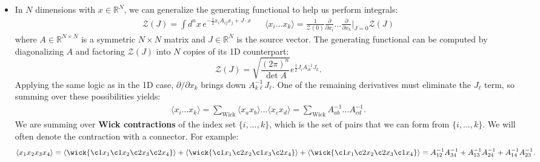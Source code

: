 \documentclass[12pt, oneside]{article}   	%
\theoremstyle{definition}
\begin{document}
\begin{itemize}
	\item In $N$ dimensions with $x\in\mathbb R^N$, we can generalize the generating functional to help us perform 
	integrals:
	\begin{align}
		\mathcal Z(J) = \int d^n x\, e^{-\frac{1}{2} x_i A_{ij} x_j + J\cdot x} && \langle x_i ... x_k\rangle = 
		\frac{1}{\mathcal Z(0)} \frac{\partial}{\partial x_i} ... \frac{\partial}{\partial x_k}\bigg|_{J = 0} \mathcal Z(J)
	\end{align}
	where $A\in\mathbb R^{N\times N}$ is a symmetric $N\times N$ matrix and $J\in\mathbb R^N$ is the source vector. 
	The generating functional can be computed by diagonalizing $A$ and factoring $\mathcal Z(J)$ into $N$ copies of 
	its 1D counterpart:
	\begin{equation}
		\mathcal Z(J) = \sqrt{\frac{(2\pi)^n}{\det A}} e^{\frac{1}{2} J_i A^{-1}_{ik} J_k}.
		\label{eq:gaussian_scalars}
	\end{equation}
	Applying the same logic as in the 1D case, $\partial / \partial x_k$ brings down $A^{-1}_{k\ell} J_\ell$. One of the 
	remaining derivatives must eliminate the $J_\ell$ term, so summing over these possibilities yields:
	\begin{align}
		\langle x_i ... x_k\rangle = \sum_\mathrm{Wick} \langle x_a x_b\rangle ... \langle x_c x_d\rangle = 
		\sum_\mathrm{Wick} A^{-1}_{ab} ... A^{-1}_{cd}.
	\end{align}
	We are summing over \textbf{Wick contractions} of the index set $\{i, ..., k\}$, which is the set of pairs that we can 
	form from $\{i, ..., k\}$. We will often denote the contraction with a connector. For example:
	\begin{equation}
		\langle x_1 x_2 x_3 x_4\rangle = \langle \wick{\c1 x_1 \c1 x_2 \c2 x_3 \c2 x_4}\rangle + \langle \wick{\c1 x_1 \c2 x_2 \c1 x_3 \c2 x_4}\rangle  + \langle \wick{\c1 x_1 \c2 x_2 \c2 x_3 \c1 x_4}\rangle = A^{-1}_{12} A^{-1}_{34} + A^{-1}_{13} 
		A^{-1}_{24} + A^{-1}_{14} A^{-1}_{23}.
	\end{equation}
	
\end{itemize}


	
	
\end{document}
